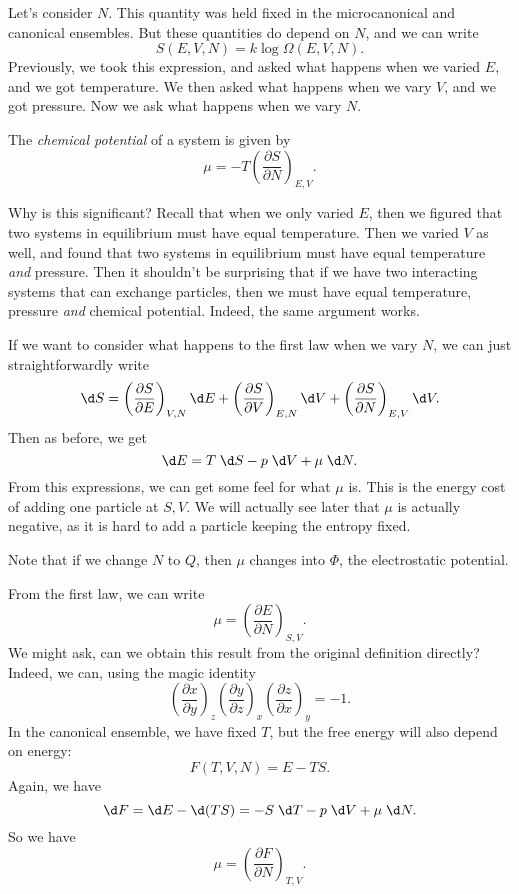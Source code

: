 \documentclass[a4paper]{article}
\begin{document}
Let's consider $N$. This quantity was held fixed in the microcanonical and canonical ensembles. But these quantities do depend on $N$, and we can write
\[
  S(E, V, N) = k \log \Omega(E, V, N).
\]
Previously, we took this expression, and asked what happens when we varied $E$, and we got temperature. We then asked what happens when we vary $V$, and we got pressure. Now we ask what happens when we vary $N$.
\begin{defi}
  The \emph{chemical potential} of a system is given by
  \[
    \mu = -T \left(\frac{\partial S}{\partial N}\right)_{E, V}.
  \]
\end{defi}

Why is this significant? Recall that when we only varied $E$, then we figured that two systems in equilibrium must have equal temperature. Then we varied $V$ as well, and found that two systems in equilibrium must have equal temperature \emph{and} pressure. Then it shouldn't be surprising that if we have two interacting systems that can exchange particles, then we must have equal temperature, pressure \emph{and} chemical potential. Indeed, the same argument works.

If we want to consider what happens to the first law when we vary $N$, we can just straightforwardly write
\[
  \d S = \left(\frac{\partial S}{\partial E}\right)_{V, N} \d E + \left(\frac{\partial S}{\partial V}\right)_{E, N} \d V + \left(\frac{\partial S}{\partial N}\right)_{E, V} \d V.
\]
Then as before, we get
\[
  \d E = T \;\d S - p \;\d V + \mu \;\d N.
\]
From this expressions, we can get some feel for what $\mu$ is. This is the energy cost of adding one particle at $S, V$. We will actually see later that $\mu$ is actually negative, as it is hard to add a particle keeping the entropy fixed.

Note that if we change $N$ to $Q$, then $\mu$ changes into $\Phi$, the electrostatic potential.

From the first law, we can write
\[
  \mu = \left(\frac{\partial E}{\partial N}\right)_{S, V}.
\]
We might ask, can we obtain this result from the original definition directly? Indeed, we can, using the magic identity
\[
  \left(\frac{\partial x}{\partial y}\right)_z \left(\frac{\partial y}{\partial z}\right)_x \left(\frac{\partial z}{\partial x}\right)_y = -1.
\]
In the canonical ensemble, we have fixed $T$, but the free energy will also depend on energy:
\[
  F(T, V, N) = E - TS.
\]
Again, we have
\[
  \d F = \d E - \d (TS) = -S\;\d T - p\;\d V + \mu\;\d N.
\]
So we have
\[
  \mu = \left(\frac{\partial F}{\partial N}\right)_{T, V}.
\]
\end{document}
